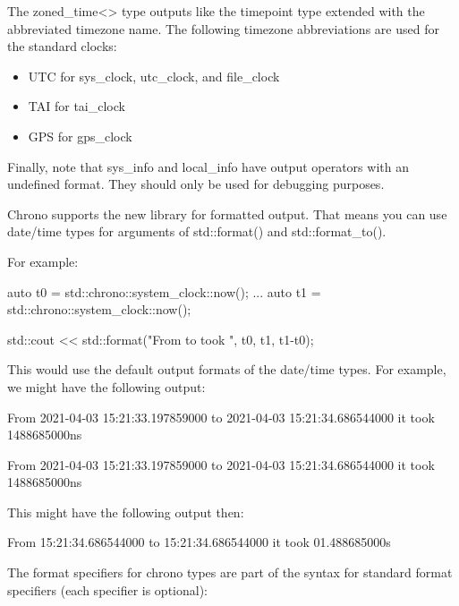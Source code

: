 The zoned\_time<> type outputs like the timepoint type extended with the abbreviated timezone name. The following timezone abbreviations are used for the standard clocks:

\begin{itemize}
\item 
UTC for sys\_clock, utc\_clock, and file\_clock

\item 
TAI for tai\_clock

\item 
GPS for gps\_clock
\end{itemize}

Finally, note that sys\_info and local\_info have output operators with an undefined format. They should only be used for debugging purposes.


Chrono supports the new library for formatted output. That means you can use date/time types for arguments of std::format() and std::format\_to().

For example:

\begin{cpp}
auto t0 = std::chrono::system_clock::now();
...
auto t1 = std::chrono::system_clock::now();

std::cout << std::format("From {} to {}\nit took {}\n", t0, t1, t1-t0);
\end{cpp}

This would use the default output formats of the date/time types. For example, we might have the following output:

\begin{shell}
From 2021-04-03 15:21:33.197859000 to 2021-04-03 15:21:34.686544000
it took 1488685000ns
\end{shell}

From 2021-04-03 15:21:33.197859000 to 2021-04-03 15:21:34.686544000 it took 1488685000ns


This might have the following output then:

\begin{shell}
From 15:21:34.686544000 to 15:21:34.686544000 it took 01.488685000s
\end{shell}

The format specifiers for chrono types are part of the syntax for standard format specifiers (each specifier is optional):

